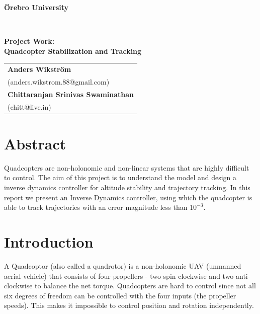 \documentclass[12pt,fleqn]{article}
\begin{document}
\thispagestyle{empty}
\noindent\makebox[\linewidth]{\rule{.75\paperwidth}{0.4pt}}
\begin{center}
{\Large \textbf{{\"O}rebro University}}
\end{center}
\vspace{-4mm}
\noindent\makebox[\linewidth]{\rule{.75\paperwidth}{0.4pt}} \\
\vspace{4cm}
\begin{center}
{\Large\sffamily\bfseries
Project Work: \\[1ex]
Quadcopter Stabilization and Tracking \\[2ex]
}

\vspace{6cm}
\noindent\makebox[\linewidth]{\rule{.75\paperwidth}{0.4pt}}
{\large
\renewcommand{\arraystretch}{1.5}
  \begin{tabular}{l}
   \textbf{Anders Wikstr\"{o}m}\\
   (anders.wikstrom.88@gmail.com)\\
   \textbf{Chittaranjan Srinivas Swaminathan}\\
   (chitt@live.in)\\
 \end{tabular}}
\end{center}
\vspace{-2mm}
\noindent\makebox[\linewidth]{\rule{.75\paperwidth}{0.4pt}}
\newpage

\tableofcontents

\newpage



\section*{Abstract}
Quadcopters are non-holonomic and non-linear systems that are highly
difficult to control. The aim of this project is to understand the
model and design a inverse dynamics controller for altitude stability
and trajectory tracking. In this report we present an Inverse Dynamics
controller, using which the quadcopter is able to track trajectories
with an error magnitude less than $10^{-3}$. 

\section{Introduction}

A Quadcoptor (also called a quadrotor) is a non-holonomic UAV
(unmanned aerial vehicle) that consists of four propellers - two spin
clockwise and two anti-clockwise to balance the net
torque. Quadcopters are hard to control since not all six degrees of
freedom can be controlled with the four inputs (the propeller speeds). This makes
it impossible to control position and rotation independently. \\
\end{document}
